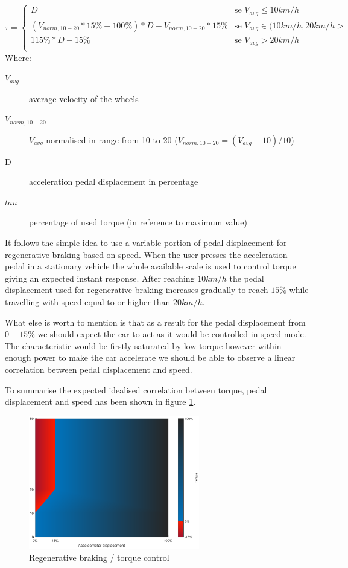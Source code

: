 \begin{equation*}
    \tau = \begin{cases}
        D & \text{se $V_{avg} \leq 10km/h$}\\
        (V_{norm,10-20} * 15\% + 100\%) * D - V_{norm,10-20} * 15\% & \text{se $V_{avg} \in (10km/h,20km/h>$}\\
        115\% * D - 15\% & \text{se $V_{avg} > 20km/h$}\\
    \end{cases}
    \label{reg_break_eq}
\end{equation*}
Where:
\begin{description}
    \item[$V_{avg}$] average velocity of the wheels 
    \item[$V_{norm,10-20}$] $V_{avg}$ normalised in range from 10 to 20 ($V_{norm,10-20}=(V_{avg}-10)/10$)
    \item[D] acceleration pedal displacement in percentage
    \item[$tau$] percentage of used torque (in reference to maximum value)
\end{description}

It follows the simple idea to use a variable portion of pedal displacement for regenerative braking based on speed.
When the user presses the acceleration pedal in a stationary vehicle the whole available scale is used to control torque giving an expected instant response. After reaching $10km/h$ the pedal displacement used for regenerative braking increases gradually to reach $15\%$ while travelling with speed equal to or higher than $20km/h$.

What else is worth to mention is that as a result for the pedal displacement from $0-15\%$ we should expect the car to act as it would be controlled in speed mode.\label{speed_mode} The characteristic would be firstly saturated by low torque however within enough power to make the car accelerate we should be able to observe a linear correlation between pedal displacement and speed.

To summarise the expected idealised correlation between torque, pedal displacement and speed has been shown in figure \ref{fig:regen_ideal}.

\begin{figure}[H]
    \centering
        \includegraphics[height=5.8cm]{figures/regen_ideal}
        \caption{Regenerative braking / torque control}
        \label{fig:regen_ideal}
\end{figure}
